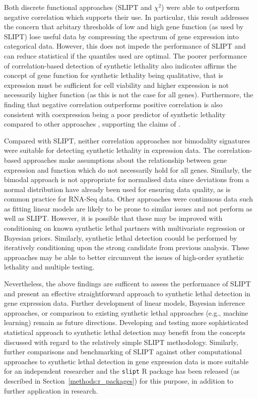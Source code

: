 Both discrete functional approaches (\gls{SLIPT} and $\chi^2$) were able to outperform negative correlation which supports their use. In particular, this result addresses the concern that arbitary thresholds of low and high gene function (as used by \gls{SLIPT}) lose useful data by compressing the spectrum of gene expression into categorical data. However, this does not impede the performance of \gls{SLIPT} and can reduce statistical if the quantiles used are optimal. The poorer performance of correlation-based detection of synthetic lethality also indicates affirms the concept of gene function for synthetic lethality being qualitative, that is expression must be sufficient for cell viability and higher expression is not necessarily higher function (as this is not the case for all genes). Furthermore, the finding that negative correlation outperforms positive correlation is also consistent with coexpression being a poor predictor of synthetic lethality compared to other approaches \citep{Jerby2014}, supporting the claims of \citet{Lu2015}.

Compared with \gls{SLIPT}, neither correlation approaches nor bimodality signatures were suitable for detecting synthetic lethality in expression data. The correlation-based approaches make assumptions about the relationship between gene expression and function which do not necessarily hold for all genes. Similarly, the bimodal approach is not appropriate for normalised data since deviations from a normal distribution have already been used for ensuring data quality, as is common practice for \gls{RNA-Seq} data. Other approaches were continuous data such as fitting linear models are likely to be prone to similar issues and not perform as well as \gls{SLIPT}. However, it is possible that these may be improved with conditioning on known synthetic lethal partners with multivariate regression or Bayesian priors. Similarly, synthetic lethal detection coould be performed by iteratively conditioning upon the strong candidate from previous analysis. These approaches may be able to better circumvent the issues of high-order synthetic lethality and multiple testing. 

Nevertheless, the above findings are sufficent to assess the performance of \gls{SLIPT} and present an effective straightforward approach to synthetic lethal detection in gene expression data. Further development of linear models, Bayesian inference approaches, or comparison to existing synthetic lethal approaches (e.g., machine learning) remain as future directions. Developing and testing more sophisticated statistical approach to synthetic lethal detection may benefit from the concepts discussed with regard to the relatively simple \gls{SLIPT} methodology. Similarly, further comparisons and benchmarking of \gls{SLIPT} against other computational approaches to synthetic lethal detection in gene expression data is more suitable for an independent researcher and the \texttt{slipt} R package has been released (as described in Section~\ref{methods:r_packages}) for this purpose, in addition to further application in research.

